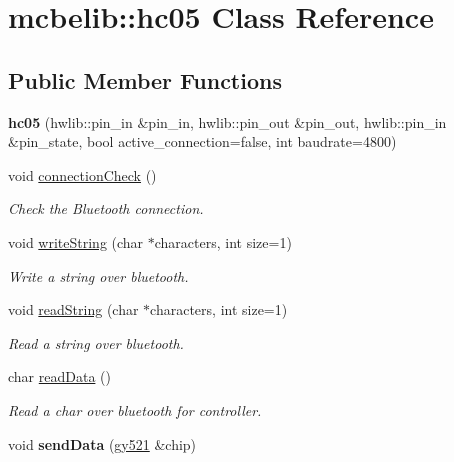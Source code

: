 \hypertarget{classmcbelib_1_1hc05}{}\section{mcbelib\+:\+:hc05 Class Reference}
\label{classmcbelib_1_1hc05}
\subsection*{Public Member Functions}
\begin{DoxyCompactItemize}
\item 
\mbox{\label{classmcbelib_1_1hc05_a4ce9ffe33f7d15025fb15043831df405}} 
{\bfseries hc05} (hwlib\+::pin\+\_\+in \&pin\+\_\+in, hwlib\+::pin\+\_\+out \&pin\+\_\+out, hwlib\+::pin\+\_\+in \&pin\+\_\+state, bool active\+\_\+connection=false, int baudrate=4800)
\item 
void \hyperlink{classmcbelib_1_1hc05_a48d294a72ba90a9cd6573da553fc7823}{connection\+Check} ()
\begin{DoxyCompactList}\small\item\em Check the Bluetooth connection. \end{DoxyCompactList}\item 
void \hyperlink{classmcbelib_1_1hc05_a3cd0be8d16a5eb990216b41e533b815c}{write\+String} (char $\ast$characters, int size=1)
\begin{DoxyCompactList}\small\item\em Write a string over bluetooth. \end{DoxyCompactList}\item 
void \hyperlink{classmcbelib_1_1hc05_a4786907ca61b495eb7a7453f8787286e}{read\+String} (char $\ast$characters, int size=1)
\begin{DoxyCompactList}\small\item\em Read a string over bluetooth. \end{DoxyCompactList}\item 
char \hyperlink{classmcbelib_1_1hc05_a718bad3e6b82582a0eb4ba5ca036b361}{read\+Data} ()
\begin{DoxyCompactList}\small\item\em Read a char over bluetooth for controller. \end{DoxyCompactList}\item 
\mbox{\label{classmcbelib_1_1hc05_ab8e13647d668978bd77654b39572008d}} 
void {\bfseries send\+Data} (\hyperlink{classmcbelib_1_1gy521}{gy521} \&chip)
\end{DoxyCompactItemize}


